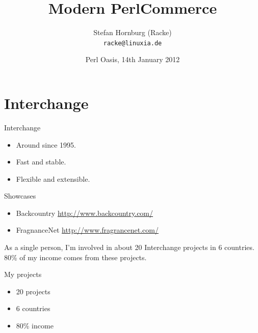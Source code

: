
\usepackage[T1]{fontenc}
\usepackage{mathptmx}
\usepackage[scaled=.90]{helvet}
\usepackage{courier}

\usepackage{beamerthemesplit}
\usepackage{verbatim}
\usepackage{hyperref}
\usepackage{listings}
\lstset{language=Perl,basicstyle=\footnotesize,tabsize=3,showstringspaces=false}


\title{Modern PerlCommerce}
\author[racke]{Stefan Hornburg (Racke)\\ \texttt{racke@linuxia.de}}
\date[]{Perl Oasis, 14th January 2012}


\maketitle{}

\begin{frame}
  \titlepage
\end{frame}

\tableofcontents

\section{Interchange}

\begin{frame}{Interchange}
\begin{itemize}
\item Around since 1995.
\item Fast and stable.
\item Flexible and extensible.
\end{itemize}
\end{frame}

\begin{frame}{Showcases}
\begin{itemize}
\item Backcountry \url{http://www.backcountry.com/}
\item FragnanceNet \url{http://www.fragrancenet.com/}
\end{itemize}
\end{frame}

As a single person, I'm involved in about 20 Interchange
projects in 6 countries. 80\% of my income comes from
these projects.

\begin{frame}{My projects}
\begin{itemize}
\item 20 projects
\item 6 countries
\item 80\% income
\end{itemize}
\end{frame}

